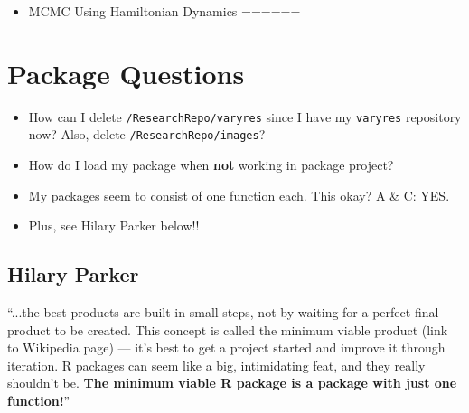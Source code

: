 \documentclass{article}
\begin{document}
\begin{itemize}
\item MCMC Using Hamiltonian Dynamics ======
\end{itemize}

\section*{Package Questions}
\begin{itemize}
\item How can I delete \verb|/ResearchRepo/varyres| since I have my \verb|varyres| repository now? Also, delete \verb|/ResearchRepo/images|?
\item How do I load my package when {\bf not} working in package project?
\item My packages seem to consist of one function each. This okay? A \& C: YES.
\item Plus, see Hilary Parker below!!
\end{itemize}

\subsection*{Hilary Parker}
``...the best products are built in small steps, not by waiting for a perfect final product to be created. This concept is called the minimum viable product (link to Wikipedia page) — it’s best to get a project started and improve it through iteration. R packages can seem like a big, intimidating feat, and they really shouldn’t be. {\bf The minimum viable R package is a package with just one function!}''
\end{document}
